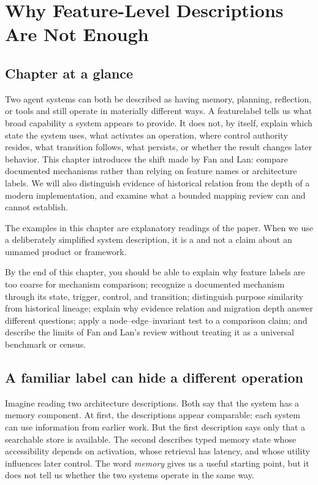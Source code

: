\chapter{Why Feature-Level Descriptions Are Not Enough}
\label{ch:feature-level-descriptions}

\section*{Chapter at a glance}
{}

Two agent systems can both be described as having memory, planning, reflection, or tools and still operate in materially different ways. A \gls{featurelabel} tells us what broad capability a system appears to provide. It does not, by itself, explain which state the system uses, what activates an operation, where control authority resides, what transition follows, what persists, or whether the result changes later behavior. This chapter introduces the shift made by Fan and Lan: compare documented mechanisms rather than relying on feature names or architecture labels. We will also distinguish evidence of historical relation from the depth of a modern implementation, and examine what a bounded mapping review can and cannot establish.

The examples in this chapter are explanatory readings of the paper. When we use a deliberately simplified system description, it is a \BookExampleLabel{} and not a claim about an unnamed product or framework.

\begin{learningbox}
By the end of this chapter, you should be able to explain why feature labels are too coarse for mechanism comparison; recognize a documented mechanism through its state, trigger, control, and transition; distinguish purpose similarity from historical lineage; explain why evidence relation and migration depth answer different questions; apply a node--edge--invariant test to a comparison claim; and describe the limits of Fan and Lan's review without treating it as a universal benchmark or census.
\end{learningbox}

\section{A familiar label can hide a different operation}
\label{sec:feature-labels}

Imagine reading two architecture descriptions. Both say that the system has a memory component. At first, the descriptions appear comparable: each system can use information from earlier work. But the first description says only that a searchable store is available. The second describes typed memory state whose accessibility depends on activation, whose retrieval has latency, and whose utility influences later control. The word \emph{memory} gives us a useful starting point, but it does not tell us whether the two systems operate in the same way.

